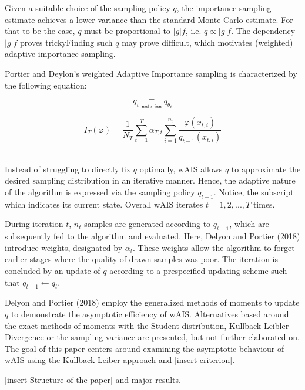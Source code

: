 \begin{multicols}{2}
\bigskip

Given a suitable choice of the sampling policy $q$, the importance sampling estimate achieves a lower variance than the standard Monte Carlo estimate. For that to be the case, $q$ must be proportional to $|g|f$, i.e. $q \displaystyle \propto |g|f$. The dependency $|g|f$ proves trickyFinding such $q$ may prove difficult, which motivates (weighted) adaptive importance sampling.

\bigskip

Portier and Deylon's weighted Adaptive Importance sampling is characterized by the following equation:

$$q_t \underset {\textsf{notation}} \equiv q_{\theta_t}$$

$$\boxed{
I_T(\varphi) = \frac 1 {N_T} \displaystyle\sum\limits_{t=1}^T \alpha_{T,t} \displaystyle\sum\limits_{i = 1}^{n_t} \frac {\varphi(x_{t,i})}{q_{t-1}(x_{t,i})}
}$$ ~\cite{portierdelyonWAIS}

Instead of struggling to directly fix $q$ optimally, wAIS allows $q$ to approximate the desired sampling distribution in an iterative manner. Hence, the adaptive nature of the algorithm is expressed via the sampling policy $q_{t-1}$. Notice, the subscript which indicates its current state. Overall wAIS iterates $t = 1, 2, ...,T$ times. 

During iteration $t$, $n_t$ samples are generated according to $q_{t-1}$, which are subsequently fed to the algorithm and evaluated. Here, Delyon and Portier (2018) introduce weights, designated by $\alpha_t$. These weights allow the algorithm to forget earlier stages where the quality of drawn samples was poor. The iteration is concluded by an update of $q$ according to a prespecified updating scheme such that $q_{t-1} \gets q_t$. 

\bigskip

Delyon and Portier (2018) employ the generalized methods of moments to update $q$ to demonstrate the asymptotic efficiency of wAIS. Alternatives based around the exact methods of moments with the Student distribution, Kullback-Leibler Divergence or the sampling variance are presented, but not further elaborated on. The goal of this paper centers around examining the asymptotic behaviour of wAIS using the Kullback-Leiber approach and [insert criterion]. 

\bigskip

[insert Structure of the paper] and major results.

\end{multicols}


